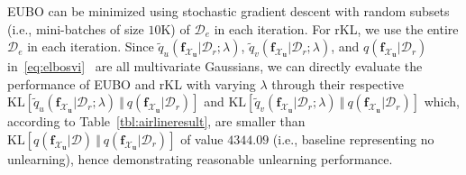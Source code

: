 \documentclass{article}
\theoremstyle{definition}
\newcommand{\mbf}[1]{\mathbf{#1}}
\newcommand{\mcl}[1]{\mathcal{#1}}
\newcommand{\eubo}{\tilde{q}_u}
\newcommand{\elbo}{\tilde{q}_v}
\begin{document}
%
EUBO can be minimized using stochastic gradient descent with random subsets (i.e., mini-batches of size $10$K) of $\mcl{D}_e$ in each iteration. 
For rKL, we use the entire $\mcl{D}_e$ in each iteration.
Since $\eubo(\mbf{f}_{\mcl{X}_\mbf{u}}| \mcl{D}_r; \lambda)$, $\elbo(\mbf{f}_{\mcl{X}_\mbf{u}}| \mcl{D}_r; \lambda)$, and $q(\mbf{f}_{\mcl{X}_\mbf{u}}| \mcl{D}_r)$  in~\eqref{eq:elbosvi}~\cite{gal2014variational} are all multivariate Gaussians,
we can directly evaluate the  performance of EUBO and rKL with varying $\lambda$ through their respective $\text{KL}[\eubo(\mbf{f}_{\mcl{X}_\mbf{u}}| \mcl{D}_r; \lambda)\ \Vert\ q(\mbf{f}_{\mcl{X}_\mbf{u}}| \mcl{D}_r)]$ and $\text{KL}[\elbo(\mbf{f}_{\mcl{X}_\mbf{u}}| \mcl{D}_r; \lambda)\ \Vert\ q(\mbf{f}_{\mcl{X}_\mbf{u}}| \mcl{D}_r)]$ which, according to Table~\ref{tbl:airlineresult}, are smaller than $\text{KL}[q(\mbf{f}_{\mcl{X}_\mbf{u}}| \mcl{D})\ \Vert\ q(\mbf{f}_{\mcl{X}_\mbf{u}}| \mcl{D}_r)]$ of value $4344.09$ (i.e., baseline representing no unlearning), hence demonstrating reasonable unlearning performance.
%
%
\end{document}
